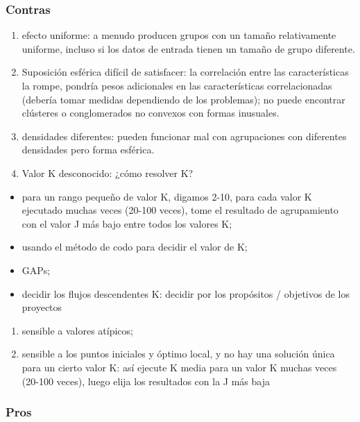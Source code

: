 \documentclass[11pt]{article}
\providecommand{\tightlist}{%
      \setlength{\itemsep}{0pt}\setlength{\parskip}{0pt}}
\begin{document}
\subsubsection{Contras}\label{contras}

\begin{enumerate}
\def\labelenumi{\arabic{enumi})}
\item
  efecto uniforme: a menudo producen grupos con un tamaño relativamente
  uniforme, incluso si los datos de entrada tienen un tamaño de grupo
  diferente.
\item
  Suposición esférica difícil de satisfacer: la correlación entre las
  características la rompe, pondría pesos adicionales en las
  características correlacionadas (debería tomar medidas dependiendo de
  los problemas); no puede encontrar clústeres o conglomerados no
  convexos con formas inusuales.
\item
  densidades diferentes: pueden funcionar mal con agrupaciones con
  diferentes densidades pero forma esférica.
\item
  Valor K desconocido: ¿cómo resolver K?
\end{enumerate}

\begin{itemize}
\tightlist
\item
  para un rango pequeño de valor K, digamos 2-10, para cada valor K
  ejecutado muchas veces (20-100 veces), tome el resultado de
  agrupamiento con el valor J más bajo entre todos los valores K;
\item
  usando el método de codo para decidir el valor de K;
\item
  GAPs;
\item
  decidir los flujos descendentes K: decidir por los propósitos /
  objetivos de los proyectos
\end{itemize}

\begin{enumerate}
\def\labelenumi{\arabic{enumi})}
\setcounter{enumi}{4}
\item
  sensible a valores atípicos;
\item
  sensible a los puntos iniciales y óptimo local, y no hay una solución
  única para un cierto valor K: así ejecute K media para un valor K
  muchas veces (20-100 veces), luego elija los resultados con la J más
  baja
\end{enumerate}

\subsubsection{Pros}\label{pros}
\end{document}

